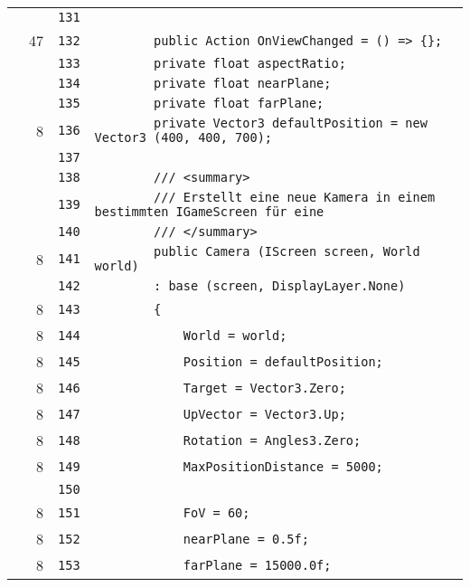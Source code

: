 \documentclass[a4paper,10pt]{article}
\begin{document}
\begin{longtable}[l]{lrrl}
\cellcolor{gray} &  & \verb~131~ & \verb~~\\
\cellcolor{green} & 47 & \verb~132~ & \verb~        public Action OnViewChanged = () => {};~\\
\cellcolor{gray} &  & \verb~133~ & \verb~        private float aspectRatio;~\\
\cellcolor{gray} &  & \verb~134~ & \verb~        private float nearPlane;~\\
\cellcolor{gray} &  & \verb~135~ & \verb~        private float farPlane;~\\
\cellcolor{green} & 8 & \verb~136~ & \verb~        private Vector3 defaultPosition = new Vector3 (400, 400, 700);~\\
\cellcolor{gray} &  & \verb~137~ & \verb~~\\
\cellcolor{gray} &  & \verb~138~ & \verb~        /// <summary>~\\
\cellcolor{gray} &  & \verb~139~ & \verb~        /// Erstellt eine neue Kamera in einem bestimmten IGameScreen für eine~\\
\cellcolor{gray} &  & \verb~140~ & \verb~        /// </summary>~\\
\cellcolor{green} & 8 & \verb~141~ & \verb~        public Camera (IScreen screen, World world)~\\
\cellcolor{gray} &  & \verb~142~ & \verb~        : base (screen, DisplayLayer.None)~\\
\cellcolor{green} & 8 & \verb~143~ & \verb~        {~\\
\cellcolor{green} & 8 & \verb~144~ & \verb~            World = world;~\\
\cellcolor{green} & 8 & \verb~145~ & \verb~            Position = defaultPosition;~\\
\cellcolor{green} & 8 & \verb~146~ & \verb~            Target = Vector3.Zero;~\\
\cellcolor{green} & 8 & \verb~147~ & \verb~            UpVector = Vector3.Up;~\\
\cellcolor{green} & 8 & \verb~148~ & \verb~            Rotation = Angles3.Zero;~\\
\cellcolor{green} & 8 & \verb~149~ & \verb~            MaxPositionDistance = 5000;~\\
\cellcolor{gray} &  & \verb~150~ & \verb~~\\
\cellcolor{green} & 8 & \verb~151~ & \verb~            FoV = 60;~\\
\cellcolor{green} & 8 & \verb~152~ & \verb~            nearPlane = 0.5f;~\\
\cellcolor{green} & 8 & \verb~153~ & \verb~            farPlane = 15000.0f;~\\

\end{longtable}
\end{document}
